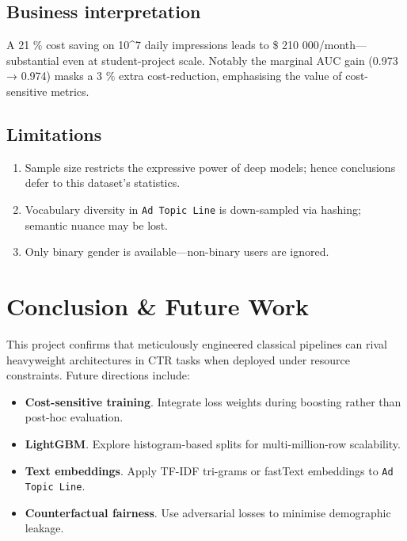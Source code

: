 \documentclass[12pt,a4paper]{article}
\begin{document}
\subsection{Business interpretation}
A 21 \% cost saving on \num{10^7} daily impressions leads to
\$ 210 000/month—substantial even at student-project scale.  
Notably the marginal AUC gain (0.973 → 0.974) masks a 3 \% extra
cost-reduction, emphasising the value of cost-sensitive metrics.

\subsection{Limitations}
\begin{enumerate}[leftmargin=2em]
  \item Sample size restricts the expressive power of deep models; hence
        conclusions defer to this dataset’s statistics.
  \item Vocabulary diversity in \texttt{Ad Topic Line} is down-sampled
        via hashing; semantic nuance may be lost.
  \item Only binary gender is available—non-binary users are ignored.
\end{enumerate}

\section{Conclusion \& Future Work} \label{sec:conclusion}

This project confirms that meticulously engineered classical pipelines
can rival heavyweight architectures in CTR tasks when deployed under
resource constraints.  
Future directions include:

\begin{itemize}[leftmargin=1.5em]
  \item \textbf{Cost-sensitive training}.  Integrate loss weights during
        boosting rather than post-hoc evaluation.
  \item \textbf{LightGBM}.  Explore histogram-based splits for
        multi-million-row scalability.
  \item \textbf{Text embeddings}.  Apply TF-IDF tri-grams or fastText
        embeddings to \texttt{Ad Topic Line}.
  \item \textbf{Counterfactual fairness}.  Use adversarial losses to
        minimise demographic leakage.
\end{itemize}
\end{document}

